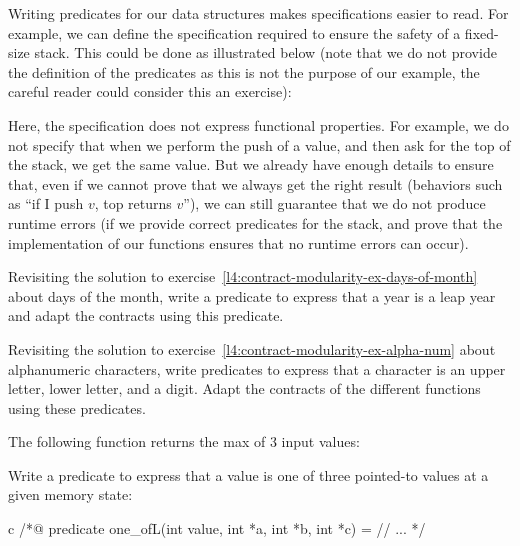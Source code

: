 Writing predicates for our data structures makes specifications easier
to read. For example, we can
define the specification required to ensure the safety of a fixed-size
stack. This could be done as illustrated below (note that we do not
provide the definition of the predicates as this is not the purpose of
our example, the careful reader could consider this an exercise):






Here, the specification does not express functional properties. For
example, we do not specify that when we perform the push of a value, and
then ask for the top of the stack, we get the same value. But we
already have enough details to ensure that, even if we cannot prove that
we always get the right result (behaviors such as ``if I push \(v\), top
returns \(v\)''), we can still guarantee that we do not produce runtime
errors (if we provide correct predicates for the stack, and prove
that the implementation of our functions ensures that no runtime errors
can occur).






Revisiting the solution to
exercise~\ref{l4:contract-modularity-ex-days-of-month} about days of the month,
write a predicate to express that a year is a leap year and adapt the contracts
using this predicate.




Revisiting the solution to
exercise~\ref{l4:contract-modularity-ex-alpha-num} about alphanumeric
characters, write predicates to express that a character is an upper letter,
lower letter, and a digit. Adapt the contracts of the different functions using
these predicates.




The following function returns the max of 3 input values:




Write a predicate to express that a value is one of three pointed-to values at a
given memory state:

\begin{CodeBlock}{c}
/*@
  predicate one_of{L}(int value, int *a, int *b, int *c) =
    // ...
*/
\end{CodeBlock}

